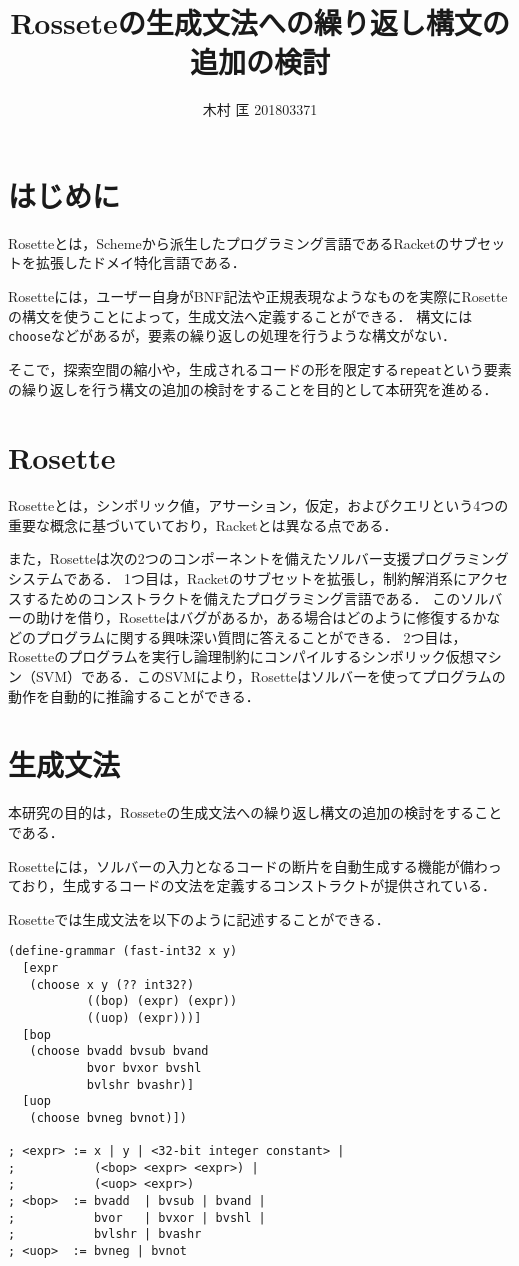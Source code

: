 \documentclass[twocolumn]{jsarticle}
\title{\textbf{Rosseteの生成文法への繰り返し構文の追加の検討}}
\author{木村 匡 201803371}
\date{} %
\begin{document}
\maketitle
\thispagestyle{fancy}

\section{はじめに}

Rosetteとは，Schemeから派生したプログラミング言語であるRacketのサブセットを拡張したドメイ特化言語である．

Rosetteには，ユーザー自身がBNF記法や正規表現なようなものを実際にRosetteの構文を使うことによって，生成文法へ定義することができる．
構文には\verb|choose|などがあるが，要素の繰り返しの処理を行うような構文がない．

そこで，探索空間の縮小や，生成されるコードの形を限定する\verb|repeat|という要素の繰り返しを行う構文の追加の検討をすることを目的として本研究を進める．

\section{Rosette}

Rosetteとは，シンボリック値，アサーション，仮定，およびクエリという4つの重要な概念に基づいていており，Racketとは異なる点である．

また，Rosetteは次の2つのコンポーネントを備えたソルバー支援プログラミングシステムである．
1つ目は，Racketのサブセットを拡張し，制約解消系にアクセスするためのコンストラクトを備えたプログラミング言語である．
このソルバーの助けを借り，Rosetteはバグがあるか，ある場合はどのように修復するかなどのプログラムに関する興味深い質問に答えることができる．
2つ目は，Rosetteのプログラムを実行し論理制約にコンパイルするシンボリック仮想マシン（SVM）である．このSVMにより，Rosetteはソルバーを使ってプログラムの動作を自動的に推論することができる．

\section{生成文法}
本研究の目的は，Rosseteの生成文法への繰り返し構文の追加の検討をすることである．

Rosetteには，ソルバーの入力となるコードの断片を自動生成する機能が備わっており，生成するコードの文法を定義するコンストラクトが提供されている．

Rosetteでは生成文法を以下のように記述することができる．

\setlength{\baselineskip}{12pt}
\begin{verbatim}
(define-grammar (fast-int32 x y)  
  [expr
   (choose x y (?? int32?)         
           ((bop) (expr) (expr))   
           ((uop) (expr)))]        
  [bop
   (choose bvadd bvsub bvand      
           bvor bvxor bvshl       
           bvlshr bvashr)]        
  [uop
   (choose bvneg bvnot)])    

; <expr> := x | y | <32-bit integer constant> |
;           (<bop> <expr> <expr>) |
;           (<uop> <expr>)	    
; <bop>  := bvadd  | bvsub | bvand |
;           bvor   | bvxor | bvshl |
;           bvlshr | bvashr
; <uop>  := bvneg | bvnot
   
\end{verbatim}
\end{document}
